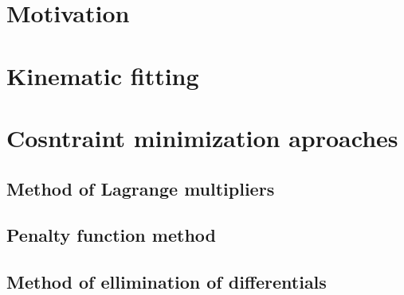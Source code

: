 \documentclass{webofc}
\begin{document}

%



\section{Motivation}

\section{Kinematic fitting}

\section{Cosntraint minimization aproaches}
  
  \subsection{Method of Lagrange multipliers}
  
  \subsection{Penalty function method}
  
  \subsection{Method of ellimination of differentials}
  
\end{document}
